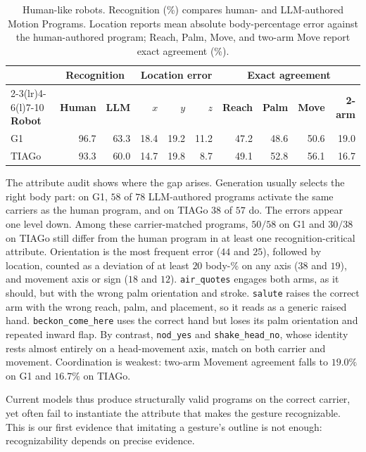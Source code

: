 \begin{table}[t]
\centering
\scriptsize
\setlength{\tabcolsep}{1.5pt}
\renewcommand{\arraystretch}{1.08}
\begin{tabular*}{\columnwidth}{@{\extracolsep{\fill}}lrrrrrrrrr@{}}
\toprule
& \multicolumn{2}{c}{\textbf{Recognition}} & \multicolumn{3}{c}{\textbf{Location error}} & \multicolumn{4}{c}{\textbf{Exact agreement}} \\
\cmidrule(lr){2-3}\cmidrule(lr){4-6}\cmidrule(l){7-10}
\textbf{Robot} & \textbf{Human} & \textbf{LLM} & $x$ & $y$ & $z$ & \textbf{Reach} & \textbf{Palm} & \textbf{Move} & \textbf{2-arm} \\
\midrule
G1 & 96.7 & 63.3 & 18.4 & 19.2 & 11.2 & 47.2 & 48.6 & 50.6 & 19.0 \\
TIAGo & 93.3 & 60.0 & 14.7 & 19.8 & 8.7 & 49.1 & 52.8 & 56.1 & 16.7 \\
\bottomrule
\end{tabular*}
\caption{Human-like robots. Recognition (\%) compares human- and LLM-authored Motion Programs. Location reports mean absolute body-percentage error against the human-authored program; Reach, Palm, Move, and two-arm Move report exact agreement (\%).}
\label{tab:humanoid-overall}
\end{table}

The attribute audit shows where the gap arises. Generation usually selects the right body part: on G1, $58$ of $78$ LLM-authored programs activate the same carriers as the human program, and on TIAGo $38$ of $57$ do. The errors appear one level down. Among these carrier-matched programs, $50/58$ on G1 and $30/38$ on TIAGo still differ from the human program in at least one recognition-critical attribute. Orientation is the most frequent error ($44$ and $25$), followed by location, counted as a deviation of at least $20$ body-\% on any axis ($38$ and $19$), and movement axis or sign ($18$ and $12$). \texttt{air\_quotes} engages both arms, as it should, but with the wrong palm orientation and stroke. \texttt{salute} raises the correct arm with the wrong reach, palm, and placement, so it reads as a generic raised hand. \texttt{beckon\_come\_here} uses the correct hand but loses its palm orientation and repeated inward flap. By contrast, \texttt{nod\_yes} and \texttt{shake\_head\_no}, whose identity rests almost entirely on a head-movement axis, match on both carrier and movement. Coordination is weakest: two-arm Movement agreement falls to $19.0\%$ on G1 and $16.7\%$ on TIAGo.

Current models thus produce structurally valid programs on the correct carrier, yet often fail to instantiate the attribute that makes the gesture recognizable. This is our first evidence that imitating a gesture's outline is not enough: recognizability depends on precise evidence.

